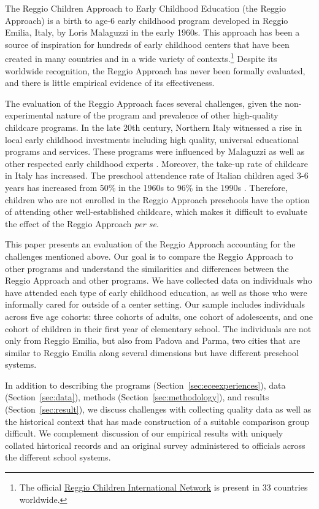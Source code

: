 
The Reggio Children Approach to Early Childhood Education (the Reggio Approach) is a birth to age-6 early childhood program developed in Reggio Emilia, Italy, by Loris Malaguzzi in the early 1960s. This approach has been a source of inspiration for hundreds of early childhood centers that have been created in many countries and in a wide variety of contexts.\footnote{The official \href{http://www.reggiochildren.it/network/?lang=en}{Reggio Children International Network} is present in 33 countries worldwide.} Despite its worldwide recognition, the Reggio Approach has never been formally evaluated, and there is little empirical evidence of its effectiveness. 

The evaluation of the Reggio Approach faces several challenges, given the non-experimental nature of the program and prevalence of other high-quality childcare programs. In the late 20th century, Northern Italy witnessed a rise in local early childhood investments including high quality, universal educational programs and services. These programs were influenced by Malaguzzi as well as other respected early childhood experts \citep{OECD_2001_Italy-Country-Note}. Moreover, the take-up rate of childcare in Italy has increased. The preschool attendence rate of Italian children aged 3-6 years has increased from 50\% in the 1960s to 96\% in the 1990s \citep{Hohnerlein_2015_Development-and-Diffusion}. Therefore, children who are not enrolled in the Reggio Approach preschools have the option of attending other well-established childcare, which makes it difficult to evaluate the effect of the Reggio Approach \textit{per se}. 

This paper presents an evaluation of the Reggio Approach accounting for the challenges mentioned above. Our goal is to compare the Reggio Approach to other programs and understand the similarities and differences between the Reggio Approach and other programs. We have collected data on individuals who have attended each type of early childhood education, as well as those who were informally cared for outside of a center setting. Our sample includes individuals across five age cohorts: three cohorts of adults, one cohort of adolescents, and one cohort of children in their first year of elementary school. The individuals are not only from Reggio Emilia, but also from Padova and Parma, two cities that are similar to Reggio Emilia along several dimensions but have different preschool systems.  

In addition to describing the programs (Section~\ref{sec:eceexperiences}), data (Section~\ref{sec:data}), methods (Section~\ref{sec:methodology}), and results (Section~\ref{sec:result}), we discuss challenges with collecting quality data as well as the historical context that has made construction of a suitable comparison group difficult. We complement discussion of our empirical results with uniquely collated historical records and an original survey administered to officials across the different school systems.

